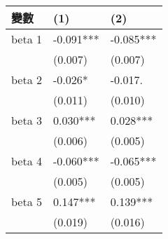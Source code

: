 \begin{tabular}{lll}
  \hline
變數 & (1) & (2) \\ 
  \hline
beta 1 & -0.091*** & -0.085*** \\ 
   & (0.007) & (0.007) \\ 
  beta 2 & -0.026* & -0.017. \\ 
   & (0.011) & (0.010) \\ 
  beta 3 & 0.030*** & 0.028*** \\ 
   & (0.006) & (0.005) \\ 
  beta 4 & -0.060*** & -0.065*** \\ 
   & (0.005) & (0.005) \\ 
  beta 5 & 0.147*** & 0.139*** \\ 
   & (0.019) & (0.016) \\ 
   \hline
\end{tabular}
